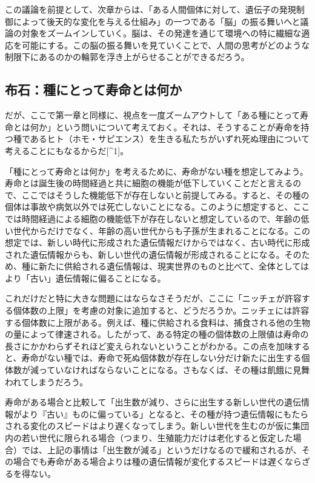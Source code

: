 この議論を前提として、次章からは、「ある人間個体に対して、遺伝子の発現制御によって後天的な変化を与える仕組み」の一つである「脳」の振る舞いへと議論の対象をズームインしていく。脳は、その発達を通じて環境への特に繊細な適応を可能にする。この脳の振る舞いを見ていくことで、人間の思考がどのような制限下にあるのかの輪郭を浮き上がらせることができるだろう。

\subsection{布石：種にとって寿命とは何か}\label{ux5e03ux77f3ux7a2eux306bux3068ux3063ux3066ux5bffux547dux3068ux306fux4f55ux304b}

だが、ここで第一章と同様に、視点を一度ズームアウトして「ある種にとって寿命とは何か」という問いについて考えておく。それは、そうすることが寿命を持つ種であるヒト（ホモ・サピエンス）を生きる私たちがいずれ死ぬ理由について考えることにもなるからだ{[}\^{}1{]}。

「種にとって寿命とは何か」を考えるために、寿命がない種を想定してみよう。寿命とは誕生後の時間経過と共に細胞の機能が低下していくことだと言えるので、ここではそうした機能低下が存在しないと前提してみる。すると、その種の個体は事故や病気以外では死亡しないことになる。このように想定すると、ここでは時間経過による細胞の機能低下が存在しないと想定しているので、年齢の低い世代からだけでなく、年齢の高い世代からも子孫が生まれることになる。この想定では、新しい時代に形成された遺伝情報だけからではなく、古い時代に形成された遺伝情報からも、新しい世代の遺伝情報が形成されることになる。そのため、種に新たに供給される遺伝情報は、現実世界のものと比べて、全体としてはより「古い」遺伝情報に偏ることになる。

これだけだと特に大きな問題にはならなさそうだが、ここに「ニッチェが許容する個体数の上限」を考慮の対象に追加すると、どうだろうか。ニッチェには許容する個体数に上限がある。例えば、種に供給される食料は、捕食される他の生物の量によって律速される。したがって、ある特定の種の個体数の上限値は寿命の長さにかかわらずそれほど変えられないということがわかる。この点を加味すると、寿命がない種では、寿命で死ぬ個体数が存在しない分だけ新たに出生する個体数が減っていなければならないことになる。さもなくば、その種は飢餓に見舞われてしまうだろう。

寿命がある場合と比較して「出生数が減り、さらに出生する新しい世代の遺伝情報がより『古い』ものに偏っている」となると、その種が持つ遺伝情報にもたらされる変化のスピードはより遅くなってしまう。新しい世代を生むのが仮に集団内の若い世代に限られる場合（つまり、生殖能力だけは老化すると仮定した場合）では、上記の事情は「出生数が減る」というだけなるので緩和されるが、その場合でも寿命がある場合よりは種の遺伝情報が変化するスピードは遅くならざるを得ない。


